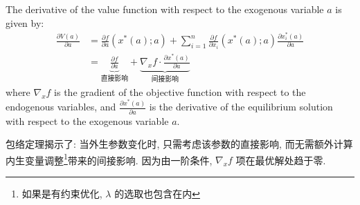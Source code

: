 \begin{theorem}
    The derivative of the value function with respect to the exogenous variable $a$ is given by:
    $$ \begin{aligned}\frac{\partial V(a)}{\partial a} &= \frac{\partial f}{\partial a} (x^*(a);a) + \sum_{i=1}^{n} \frac{\partial f}{\partial x_i} (x^*(a);a) \frac{\partial x^*_i(a)}{\partial a} \\ &=  \underbrace{\frac{\partial f}{\partial a}}_{\text{直接影响}} + \underbrace{\nabla_x f \cdot \frac{\partial x^*(a)}{\partial a}}_{\text{间接影响}} \end{aligned} $$
    where $\nabla_x f$ is the gradient of the objective function with respect to the endogenous variables, and $\frac{\partial x^*(a)}{\partial a}$ is the derivative of the equilibrium solution with respect to the exogenous variable $a$.
\end{theorem}

\begin{note}
包络定理揭示了: 当外生参数变化时, 只需考虑该参数的直接影响, 而无需额外计算内生变量调整\footnote{如果是有约束优化, $\lambda$ 的选取也包含在内}带来的间接影响. 因为由一阶条件,  $\nabla_x f$ 项在最优解处趋于零.

\end{note}

%







